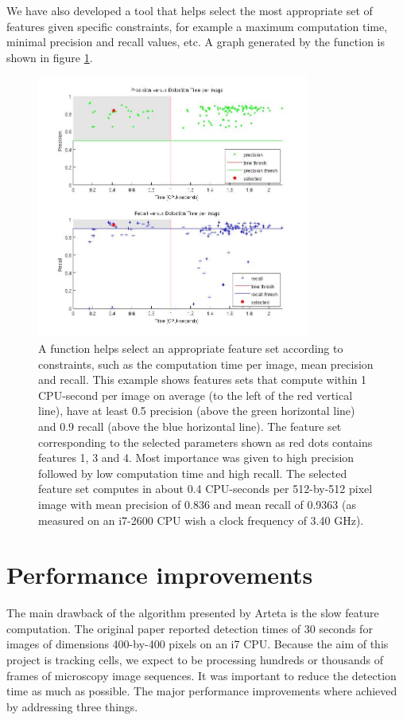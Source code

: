 	We have also developed a tool that helps select the most appropriate set of features given specific constraints, for example a maximum computation time, minimal precision and recall values, etc. A graph generated by the function is shown in figure \ref{fig:bestFeatureSelector}.
	
	\begin{figure}[h]
		\centering
		\includegraphics[width=0.8\textwidth]{images/best_features}
		\caption{A function helps select an appropriate feature set according to constraints, such as the computation time per image, mean precision and recall. This example shows features sets that compute within 1 CPU-second per image on average (to the left of the red vertical line), have at least 0.5 precision (above the green horizontal line) and 0.9 recall (above the blue horizontal line). The feature set corresponding to the selected parameters shown as red dots contains features 1, 3 and 4. Most importance was given to high precision followed by low computation time and high recall. The selected feature set computes in about 0.4 CPU-seconds per 512-by-512 pixel image with mean precision of 0.836 and mean recall of 0.9363 (as measured on an i7-2600 CPU wish a clock frequency of 3.40 GHz).}
	    \label{fig:bestFeatureSelector}
	\end{figure}
	
	\section{Performance improvements \statusfirstdraft}
	\label{sec:detector_changes}
		The main drawback of the algorithm presented by Arteta \cite{arteta12} is the slow feature computation. The original paper reported detection times of 30 seconds for images of dimensions 400-by-400 pixels on an i7 CPU. Because the aim of this project is tracking cells, we expect to be processing hundreds or thousands of frames of microscopy image sequences. It was important to reduce the detection time as much as possible. The major performance improvements where achieved by addressing three things.
		
